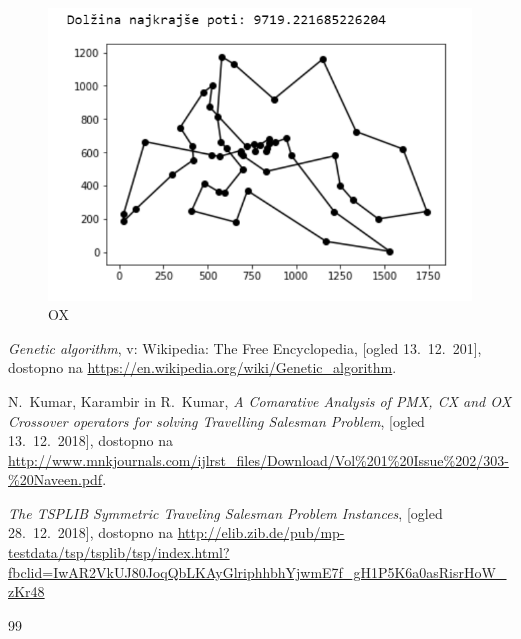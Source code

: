 \documentclass[12pt,a4paper]{amsart}
\theoremstyle{definition} %
\theoremstyle{plain} %
\begin{document}
\begin{figure}[h!]
\begin{minipage}[t]{0.48\textwidth}
\includegraphics[width=\linewidth,keepaspectratio=true]{OX-primer}
\caption{OX}
\label{OX}
\end{minipage}
\end{figure}



\newpage
\begin{thebibliography}{99}


\emph{Genetic algorithm}, v: Wikipedia: The Free Encyclopedia, [ogled 13.~12.~201], dostopno na \url{https://en.wikipedia.org/wiki/Genetic_algorithm}.

N.~Kumar, Karambir in R.~Kumar, \emph{A Comarative Analysis of PMX, CX and OX Crossover operators for solving Travelling Salesman Problem}, [ogled 13.~12.~2018], dostopno na \url{http://www.mnkjournals.com/ijlrst_files/Download/Vol%201%20Issue%202/303-%20Naveen.pdf}.


 \emph{ The TSPLIB Symmetric Traveling Salesman Problem Instances}, [ogled 28.~12.~2018], dostopno na \url{http://elib.zib.de/pub/mp-testdata/tsp/tsplib/tsp/index.html?fbclid=IwAR2VkUJ80JoqQbLKAyGlriphhbhYjwmE7f_gH1P5K6a0asRisrHoW_zKr48}




\end{thebibliography}{99}
\end{document}
